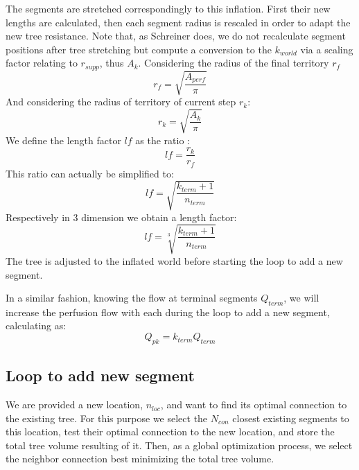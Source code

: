 \documentclass[a4paper, 11pt]{article} %
\begin{document}
The segments are stretched correspondingly to this inflation. First their new lengths are calculated, then each segment radius is rescaled in order to adapt the new tree resistance. 
Note that, as Schreiner does, we do not recalculate segment positions after tree stretching but compute a conversion to the $k_{world}$ via a scaling factor relating to $r_{supp}$, thus $A_k$. Considering the radius of the final territory $r_f$
\begin{equation}
r_f = \sqrt{\frac{A_{perf}}{\pi}}  
\end{equation}
And considering the radius of territory of current step $r_{k}$:
\begin{equation}
r_k = \sqrt{\frac{A_k}{\pi}} 
\end{equation}
We define the length factor $lf$ as the ratio :
\begin{equation}
lf = \frac{r_k}{r_f}
\end{equation} 
This ratio can actually be simplified to:
\begin{equation}
lf = \sqrt{\frac{k_{term} + 1}{n_{term}}}
\end{equation}  
Respectively in 3 dimension we obtain a length factor:
\begin{equation}
lf = \sqrt[3]{\frac{k_{term} + 1}{n_{term}}}
\end{equation}
The tree is adjusted to the inflated world before starting the loop to add a new segment.

In a similar fashion, knowing the flow at terminal segments $Q_{term}$, we will increase the perfusion flow with each during the loop to add a new segment, calculating as:
\begin{equation}
Q_{pk} = k_{term} Q_{term}
\end{equation}  




\subsection{Loop to add new segment}
We are provided a new location, $n_{loc}$, and want to find its optimal connection to the existing tree. For this purpose we select the $N_{con}$ closest existing segments to this location, test their optimal connection to the new location, and store the total tree volume resulting of it. Then, as a global optimization process, we select the neighbor connection best minimizing the total tree volume.
\end{document}
